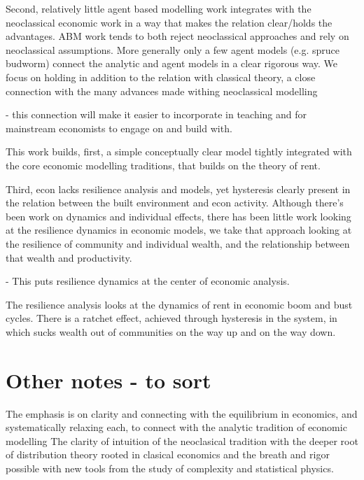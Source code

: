 Second, relatively little agent based modelling work integrates with the neoclassical economic work in a way that makes the relation clear/holds the advantages. ABM work tends to both reject neoclassical approaches and rely on neoclassical assumptions.
More generally only a few agent models (e.g. spruce budworm) connect the analytic and agent models in a clear rigorous way. We focus on holding in addition to the relation with classical theory, a close connection with the many advances made withing neoclassical modelling

- this connection will make it easier to incorporate in teaching and for mainstream economists to engage on and build with.


This work builds, first, a simple conceptually clear model tightly integrated with the core economic modelling traditions, that builds on the theory of rent.


Third, econ lacks resilience analysis and models, yet hysteresis clearly present in the relation between the built environment and econ activity. Although there's been work on dynamics and individual effects, there has been little work looking at the resilience dynamics in economic models, we take that approach looking at the resilience of community and individual wealth, and the relationship between that wealth and productivity. 

- This puts resilience dynamics at the center of economic analysis.

The resilience analysis looks at the dynamics of rent in economic boom and bust cycles.
There is a ratchet effect, achieved through hysteresis in the system, in which sucks wealth out of communities on the way up and on the way down. %


\section{Other notes - to sort}
The emphasis is on clarity and connecting with the equilibrium in economics, and systematically relaxing each, to connect with the analytic tradition of economic modelling
The clarity of intuition of the neoclasical tradition with the deeper root of distribution theory rooted in clasical economics and the breath and rigor possible with new tools from the study of complexity and statistical physics.



